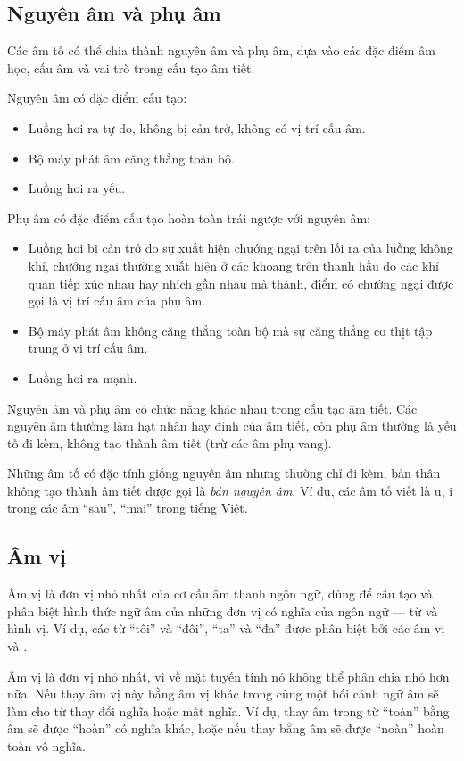 \documentclass[a4paper,oneside,14pt]{extbook} %
\begin{document}
\subsection{Nguyên âm và phụ âm}

Các âm tố có thể chia thành nguyên âm và phụ âm, dựa vào các đặc điểm
âm học, cấu âm và vai trò trong cấu tạo âm tiết.

Nguyên âm có đặc điểm cấu tạo:
\begin{itemize}
\item Luồng hơi ra tự do, không bị cản trở, không có vị trí cấu âm.
\item Bộ máy phát âm căng thẳng toàn bộ.
\item Luồng hơi ra yếu.
\end{itemize}

Phụ âm có đặc điểm cấu tạo hoàn toàn trái ngược với nguyên âm:
\begin{itemize}
\item Luồng hơi bị cản trở do sự xuất hiện chướng ngại trên lối ra của
  luồng không khí, chướng ngại thường xuất hiện ở các khoang trên
  thanh hầu do các khí quan tiếp xúc nhau hay nhích gần nhau mà thành,
  điểm có chướng ngại được gọi là vị trí cấu âm của phụ âm.
\item Bộ máy phát âm không căng thẳng toàn bộ mà sự căng thẳng cơ thịt
  tập trung ở vị trí cấu âm.
\item Luồng hơi ra mạnh.
\end{itemize}

Nguyên âm và phụ âm có chức năng khác nhau trong cấu tạo âm tiết. Các
nguyên âm thường làm hạt nhân hay đỉnh của âm tiết, còn phụ âm thường
là yếu tố đi kèm, không tạo thành âm tiết (trừ các âm phụ vang).

Những âm tố có đặc tính giống nguyên âm nhưng thường chỉ đi kèm, bản
thân không tạo thành âm tiết được gọi là {\em bán nguyên âm}. Ví dụ,
các âm tố viết là u, i trong các âm ``sau'', ``mai'' trong tiếng Việt.


\subsection{Âm vị}

Âm vị là đơn vị nhỏ nhất của cơ cấu âm thanh ngôn ngữ, dùng để cấu tạo
và phân biệt hình thức ngữ âm của những đơn vị có nghĩa của ngôn ngữ
--- từ và hình vị. Ví dụ, các từ ``tôi'' và ``đôi'', ``ta'' và ``đa''
được phân biệt bởi các âm vị  và .

Âm vị là đơn vị nhỏ nhất, vì về mặt tuyến tính nó không thể phân chia
nhỏ hơn nữa. Nếu thay âm vị này bằng âm vị khác trong cùng một bối
cảnh ngữ âm sẽ làm cho từ thay đổi nghĩa hoặc mất nghĩa. Ví dụ, thay
âm  trong từ ``toàn'' bằng âm  sẽ được
``hoàn'' có nghĩa khác, hoặc nếu thay bằng âm  sẽ được
``noàn'' hoàn toàn vô nghĩa.
\end{document}
